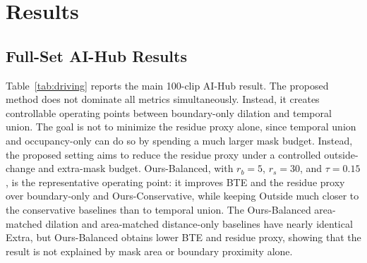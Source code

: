 \documentclass[nouppercase]{kaia}
\begin{document}
\section{Results}
\subsection{Full-Set AI-Hub Results}
Table~\ref{tab:driving} reports the main 100-clip AI-Hub result. The proposed method does not dominate all metrics simultaneously. Instead, it creates controllable operating points between boundary-only dilation and temporal union. The goal is not to minimize the residue proxy alone, since temporal union and occupancy-only can do so by spending a much larger mask budget. Instead, the proposed setting aims to reduce the residue proxy under a controlled outside-change and extra-mask budget. Ours-Balanced, with $r_b=5$, $r_s=30$, and $\tau=0.15$, is the representative operating point: it improves BTE and the residue proxy over boundary-only and Ours-Conservative, while keeping Outside much closer to the conservative baselines than to temporal union. The Ours-Balanced area-matched dilation and area-matched distance-only baselines have nearly identical Extra, but Ours-Balanced obtains lower BTE and residue proxy, showing that the result is not explained by mask area or boundary proximity alone.
\end{document}
